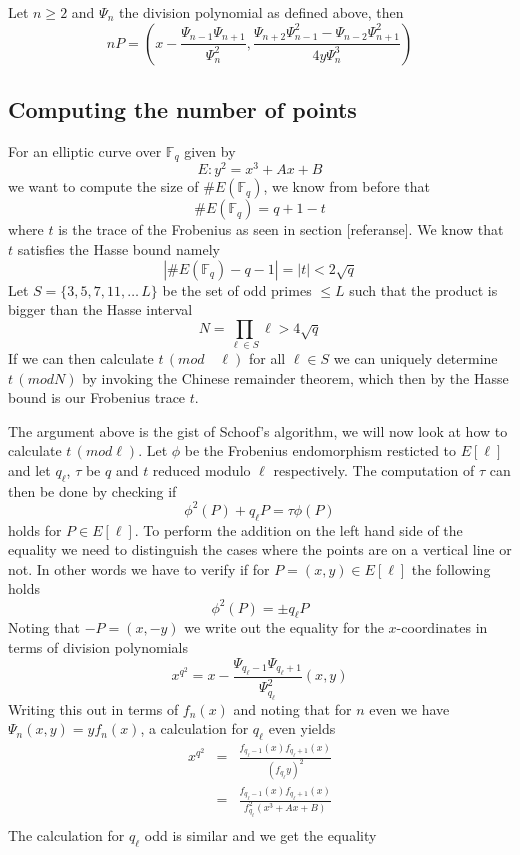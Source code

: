 \begin{prop}
 Let $n \geq 2$ and $\Psi_n$ the division polynomial as defined above, then
$$ nP = (x - \frac{\Psi_{n-1} \Psi_{n+1}}{\Psi_n^2}, \frac{\Psi_{n+2} \Psi_{n-1}^2 - \Psi_{n-2} \Psi_{n+1}^2}{4y \Psi_n^3} )$$
\end{prop}

\subsection{Computing the number of points}
For an elliptic curve over $\mathbb{F}_q$ given by
$$ E: y^2 = x^3 + Ax + B $$
we want to compute the size of $\#E(\mathbb{F}_q)$, we know from before that
$$ \#E(\mathbb{F}_q) = q + 1 - t $$
where $t$ is the trace of the Frobenius as seen in section [referanse]. We know
that $t$ satisfies the Hasse bound namely
$$ |\#E(\mathbb{F}_q)-q-1|=|t| < 2\sqrt{q} $$
Let $S = \{3, 5, 7, 11, \ldots \, L \}$ be the set of odd primes $\leq L$ such
that the product is bigger than the Hasse interval
$$ N = \prod_{\ell \in S} \ell  > 4\sqrt{q} $$
If we can then calculate $t\, (mod\quad \ell)$ for all $\ell \in S$ we can uniquely
determine $t\,(mod N)$ by invoking the Chinese remainder theorem,
which then by the Hasse bound is our Frobenius trace $t$.

The argument above is the gist of Schoof's algorithm, we will now look at
how to calculate $t\, (mod \ell)$. Let $\phi$ be the Frobenius endomorphism
resticted to $E[\ell]$ and let $q_\ell$, $\tau$ be $q$ and $t$ reduced modulo $\ell$
respectively. The computation of $\tau$ can then be done by checking if
$$ \phi^2(P) + q_\ell P = \tau \phi(P) $$
holds for $P \in E[\ell]$. To perform the addition on the left hand side of the
equality we need to distinguish the cases where the points are on a vertical line or not.
In other words we have to verify if for $P = (x,y) \in E[\ell]$ the following holds
$$ \phi^2 (P) = \pm q_\ell P $$
Noting that $-P = (x, -y)$ we write out the equality for the $x$-coordinates in terms of
division polynomials
$$ x^{q^2} = x - \frac{\Psi_{q_\ell-1} \Psi_{q_\ell+1}}{\Psi_{q_\ell}^2}(x,y) $$
Writing this out in terms of $f_n(x)$ and noting that for $n$ even we have
$\Psi_n(x,y) = y f_n(x)$, a calculation for $q_\ell$ even yields
\begin{eqnarray*}
 x^{q^2} &=& \frac{f_{q_\ell-1}(x) f_{q_\ell+1}(x)}{(f_{q_\ell} y)^2} \nonumber \\
	 &=& \frac{f_{q_\ell-1}(x) f_{q_\ell+1}(x)}{f_{q_\ell}^2 (x^3+Ax+B)} \nonumber \\
\end{eqnarray*}
The calculation for $q_\ell$ odd is similar and we get the equality

